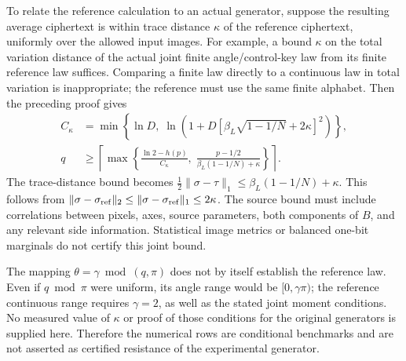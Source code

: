 \documentclass[11pt,a4paper]{article}
\begin{document}
{To relate the reference calculation to an actual generator, suppose
the resulting average ciphertext is within trace distance $\kappa$
of the reference ciphertext, uniformly over the allowed input images.
For example, a bound $\kappa$ on the total variation distance of the
actual joint finite angle/control-key law from its finite reference
law suffices. Comparing a finite law directly to a continuous law in
total variation is inappropriate; the reference must use the same
finite alphabet. Then the preceding proof gives
\begin{equation}
\label{eq:qef_source_robust_bound}
\begin{split}
 C_{\kappa}&=\min\!\left\{\ln D,\;
 \ln\!\left(1+D[\beta_L\sqrt{1-1/N}+2\kappa]^2\right)\right\},\\
 q&\geq\left\lceil\max\!\left\{
 \frac{\ln2-h(p)}{C_\kappa},\;
 \frac{p-1/2}{\beta_L(1-1/N)+\kappa}
 \right\}\right\rceil.
\end{split}
\end{equation}
The trace-distance bound becomes
$\frac12\|\sigma-\tau\|_1\leq\beta_L(1-1/N)+\kappa$.
This follows from $\|\sigma-\sigma_{\rm ref}\|_2
\leq\|\sigma-\sigma_{\rm ref}\|_1\leq2\kappa$.
The source bound must include correlations between pixels, axes,
source parameters, both components of $B$, and any relevant side
information. Statistical image metrics or balanced one-bit marginals
do not certify this joint bound.

The mapping $\theta=\gamma\bmod(q,\pi)$ does not by itself establish
the reference law. Even if $q\bmod\pi$ were uniform, its angle range
would be $[0,\gamma\pi)$; the reference continuous range requires
$\gamma=2$, as well as the stated joint moment conditions. No measured
value of $\kappa$ or proof of those conditions for the original
generators is supplied here. Therefore the numerical rows are
conditional benchmarks and are not asserted as certified resistance
of the experimental generator.

}
\end{document}
